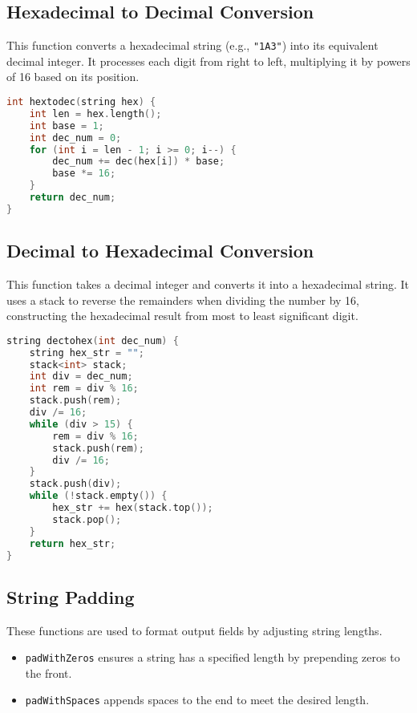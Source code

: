\documentclass[12pt]{article}
\begin{document}
\subsection{Hexadecimal to Decimal Conversion}
This function converts a hexadecimal string (e.g., \texttt{"1A3"}) into its equivalent decimal integer. It processes each digit from right to left, multiplying it by powers of 16 based on its position.

\begin{lstlisting}[language=C++, caption={hextodec() - Hex to Decimal}]
int hextodec(string hex) {
    int len = hex.length();
    int base = 1;
    int dec_num = 0;
    for (int i = len - 1; i >= 0; i--) {
        dec_num += dec(hex[i]) * base;
        base *= 16;
    }
    return dec_num;
}
\end{lstlisting}

\subsection{Decimal to Hexadecimal Conversion}
This function takes a decimal integer and converts it into a hexadecimal string. It uses a stack to reverse the remainders when dividing the number by 16, constructing the hexadecimal result from most to least significant digit.

\begin{lstlisting}[language=C++, caption={dectohex() - Decimal to Hex}]
string dectohex(int dec_num) {
    string hex_str = "";
    stack<int> stack;
    int div = dec_num;
    int rem = div % 16;
    stack.push(rem);
    div /= 16;
    while (div > 15) {
        rem = div % 16;
        stack.push(rem);
        div /= 16;
    }
    stack.push(div);
    while (!stack.empty()) {
        hex_str += hex(stack.top());
        stack.pop();
    }
    return hex_str;
}
\end{lstlisting}

\subsection{String Padding}
These functions are used to format output fields by adjusting string lengths. 

\begin{itemize}
    \item \texttt{padWithZeros} ensures a string has a specified length by prepending zeros to the front.
    \item \texttt{padWithSpaces} appends spaces to the end to meet the desired length.
\end{itemize}
\end{document}
